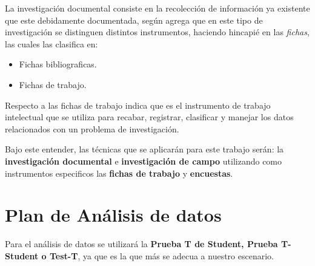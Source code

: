 La investigaci\'on documental consiste en la recolecci\'on de informaci\'on ya existente
que este debidamente documentada, seg\'un \cite{robledo} agrega que en este tipo
de investigaci\'on se distinguen distintos instrumentos, haciendo hincapi\'e en las
\emph{fichas}, las cuales \citep{robledo} las clasifica en:
\begin{itemize}
    \item Fichas bibliograficas.
    \item Fichas de trabajo.
\end{itemize}

Respecto a las fichas de trabajo \cite{robledo} indica que es el instrumento de
trabajo intelectual que se utiliza para recabar, registrar, clasificar y
manejar los datos relacionados con un problema de investigaci\'on.

Bajo este entender, las t\'ecnicas que se aplicar\'an para este trabajo ser\'an:
la \textbf{investigaci\'on documental} e \textbf{investigaci\'on de campo} utilizando
como instrumentos especificos las \textbf{fichas de trabajo} y \textbf{encuestas}.


\section{Plan de An\'alisis de datos}
Para el an\'alisis de datos se utilizar\'a la \textbf{Prueba T de Student, Prueba
T-Student o Test-T}, ya que es la que m\'as se adecua a nuestro escenario.
